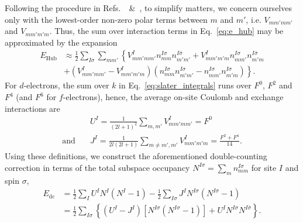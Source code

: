 {%
Following the procedure in 
Refs.~\cite{PhysRevB.71.035105}~\&~\cite{PhysRevB.84.115108},
to simplify matters,  
we concern ourselves only 
with the lowest-order non-zero polar terms 
between $m$ and $m'$, i.e.
$V_{mm'mm'}$ and $V_{mm'm'm}$.
%
Thus, the sum over interaction terms in  
Eq.~\eqref{eq:e_hub} 
may be approximated by the expansion 
%
\begin{align}
E_\textrm{Hub}%
&\approx\frac{1}{2}\sum_{I\sigma}\sum_{mm'}\left\{V^I_{mm'mm'}n_{mm}^{I\sigma}n_{m'm'}^{I\bar\sigma}+V^I_{mm'm'm}n_{mm'}^{I\sigma}n_{m'm}^{I\bar\sigma}\right.\nonumber \\[0.5em]
&\left.+(V^I_{mm'mm'}-V^I_{mm'm'm})(n_{mm}^{I\sigma}n_{m'm'}^{I\sigma}-n_{mm'}^{I\sigma}n_{m'm}^{I\sigma})\right\}.
\label{eq:e_hub_reduced}
\end{align}
%
For $d$-electrons, 
the sum over $k$ 
in Eq.~\eqref{eq:slater_integrals} 
runs over 
$F^0$, $F^2$ and $F^4$ 
(and $F^6$ for $f$-electrons), 
hence, the average on-site 
Coulomb and exchange interactions 
are 
%
\begin{align}
&U^I=\frac{1}{(2l+1)^2}\sum_{m,m'}V_{mm'mm'}^I=F^0\nonumber\\[0.5em]
\mbox{and}\quad&
J^I=\frac{1}{2l(2l+1)}\sum_{m\neq m',m'}V_{mm'm'm}^I=\frac{F^2+F^4}{14}.
\label{eq:interaction_parameters}
\end{align}
%
%
Using these definitions, 
we construct the aforementioned 
double-counting correction 
in terms of the total subspace occupancy 
$N^{I\sigma}=\sum_{m} n^{I\sigma}_{mm}$
for site $I$ and spin $\sigma$,
%
\begin{align}
E_\textrm{dc}&=\frac{1}{2}\sum_{I}U^IN^{I}(N^{I}-1)-\frac{1}{2}\sum_{I\sigma}J^IN^{I\sigma}(N^{I\sigma}-1)\nonumber\\[0.5em]
&=\frac{1}{2}\sum_{I\sigma}\left\{(U^I-J^I)\left[N^{I\sigma}(N^{I\sigma}-1)\right]+U^IN^{I\sigma}N^{I\bar\sigma}\right\}.

\end{align}}
